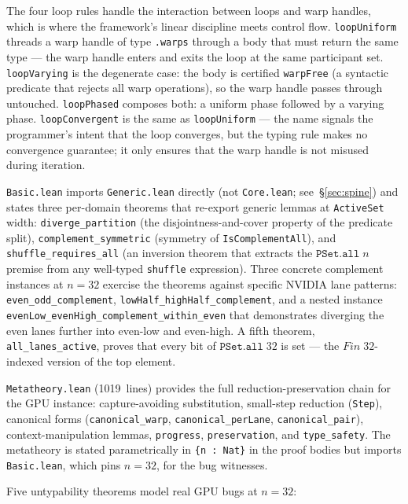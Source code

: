 \documentclass[acmsmall,screen,review,anonymous,nonacm]{acmart}
\newcommand{\IsComplementAll}{\texttt{IsComplementAll}}
\begin{document}
The four loop rules handle the interaction between loops and warp handles, which is where the framework's linear discipline meets control flow. \texttt{loopUniform} threads a warp handle of type \texttt{.warp\;s} through a body that must return the same type --- the warp handle enters and exits the loop at the same participant set. \texttt{loopVarying} is the degenerate case: the body is certified \texttt{warpFree} (a syntactic predicate that rejects all warp operations), so the warp handle passes through untouched. \texttt{loopPhased} composes both: a uniform phase followed by a varying phase. \texttt{loopConvergent} is the same as \texttt{loopUniform} --- the name signals the programmer's intent that the loop converges, but the typing rule makes no convergence guarantee; it only ensures that the warp handle is not misused during iteration.

\texttt{Basic.lean} imports \texttt{Generic.lean} directly (not \texttt{Core.lean}; see~\S\ref{sec:spine}) and states three per-domain theorems that re-export generic lemmas at \texttt{ActiveSet} width: \texttt{diverge\_partition} (the disjointness-and-cover property of the predicate split), \texttt{complement\_symmetric} (symmetry of \IsComplementAll{}), and \texttt{shuffle\_requires\_all} (an inversion theorem that extracts the $\texttt{PSet.all}\;n$ premise from any well-typed \texttt{shuffle} expression). Three concrete complement instances at $n = 32$ exercise the theorems against specific NVIDIA lane patterns: \texttt{even\_odd\_complement}, \texttt{lowHalf\_highHalf\_complement}, and a nested instance \texttt{evenLow\_evenHigh\_complement\_within\_even} that demonstrates diverging the even lanes further into even-low and even-high. A fifth theorem, \texttt{all\_lanes\_active}, proves that every bit of $\texttt{PSet.all}\;32$ is set --- the $\mathit{Fin}\;32$-indexed version of the top element.

\texttt{Metatheory.lean} (1019~lines) provides the full reduction-preservation chain for the GPU instance: capture-avoiding substitution, small-step reduction (\texttt{Step}), canonical forms (\texttt{canonical\_warp}, \texttt{canonical\_perLane}, \texttt{canonical\_pair}), context-manipulation lemmas, \texttt{progress}, \texttt{preservation}, and \texttt{type\_safety}. The metatheory is stated parametrically in \texttt{\{n : Nat\}} in the proof bodies but imports \texttt{Basic.lean}, which pins $n = 32$, for the bug witnesses.

Five untypability theorems model real GPU bugs at $n = 32$:
\end{document}
